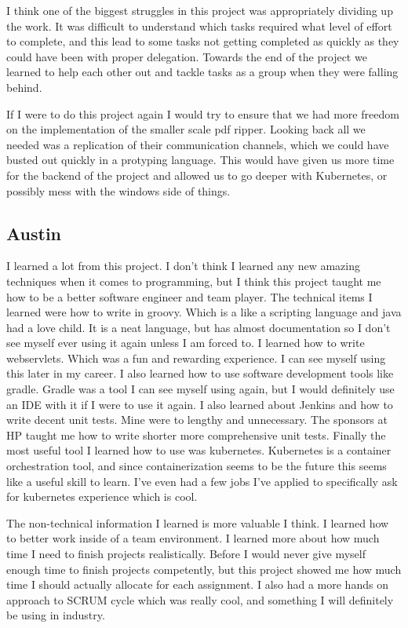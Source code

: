 \documentclass[onecolumn, draftclsnofoot,10pt, compsoc]{IEEEtran}
\begin{document}
I think one of the biggest struggles in this project was appropriately dividing up the work. It was difficult to understand which tasks required what level of effort to complete, and this lead to some tasks not getting completed as quickly as they could have been with proper delegation. Towards the end of the project we learned to help each other out and tackle tasks as a group when they were falling behind.

If I were to do this project again I would try to ensure that we had more freedom on the implementation of the smaller scale pdf ripper. Looking back all we needed was a replication of their communication channels, which we could have busted out quickly in a protyping language. This would have given us more time for the backend of the project and allowed us to go deeper with Kubernetes, or possibly mess with the windows side of things.

\subsection{Austin}

I learned a lot from this project. I don't think I learned any new amazing techniques when it comes to programming, but I think this project taught me how to be a better software engineer and team player. The technical items I learned were how to write in groovy. Which is a like a scripting language and java had a love child. It is a neat language, but has almost documentation so I don't see myself ever using it again unless I am forced to. I learned how to write webservlets. Which was a fun and rewarding experience. I can see myself using this later in my career. I also learned how to use software development tools like gradle. Gradle was a tool I can see myself using again, but I would definitely use an IDE with it if I were to use it again. I also learned about Jenkins and how to write decent unit tests. Mine were to lengthy and unnecessary. The sponsors at HP taught me how to write shorter more comprehensive unit tests. Finally the most useful tool I learned how to use was kubernetes. Kubernetes is a container orchestration tool, and since containerization seems to be the future this seems like a useful skill to learn. I've even had a few jobs I've applied to specifically ask for kubernetes experience which is cool.

The non-technical information I learned is more valuable I think. I learned how to better work inside of a team environment. I learned more about how much time I need to finish projects realistically. Before I would never give myself enough time to finish projects competently, but this project showed me how much time I should actually allocate for each assignment. I also had a more hands on approach to SCRUM cycle which was really cool, and something I will definitely be using in industry.
\end{document}
